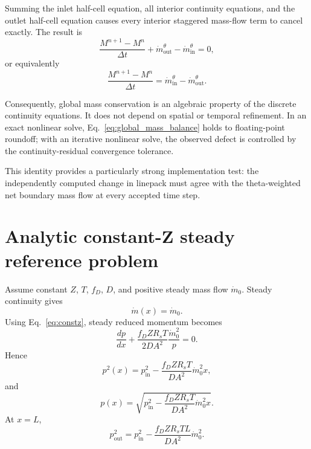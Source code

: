 \documentclass[11pt]{article}
\newcommand{\mdot}{\dot m}
\begin{document}
Summing the inlet half-cell equation,
all interior continuity equations, and the outlet half-cell equation
causes every interior staggered mass-flow term to cancel exactly.
The result is
\begin{equation}
\frac{M^{n+1}-M^n}{\Delta t}
+
\mdot_{\mathrm{out}}^\theta
-
\mdot_{\mathrm{in}}^\theta
=0,
\end{equation}
or equivalently
\begin{equation}
\boxed{
\frac{M^{n+1}-M^n}{\Delta t}
=
\mdot_{\mathrm{in}}^\theta
-
\mdot_{\mathrm{out}}^\theta.}
\label{eq:global_mass_balance}
\end{equation}

Consequently, global mass conservation is an algebraic property of the
discrete continuity equations.  It does not depend on spatial or
temporal refinement.  In an exact nonlinear solve,
Eq.~\eqref{eq:global_mass_balance} holds to floating-point roundoff;
with an iterative nonlinear solve, the observed defect is controlled
by the continuity-residual convergence tolerance.

This identity provides a particularly strong implementation test:
the independently computed change in linepack must agree with the
theta-weighted net boundary mass flow at every accepted time step.

\section{Analytic constant-Z steady reference problem}
Assume constant $Z$, $T$, $f_D$, $D$, and positive steady mass flow $\mdot_0$. Steady continuity gives
\begin{equation}
\mdot(x)=\mdot_0.
\end{equation}
Using Eq.~\eqref{eq:constz}, steady reduced momentum becomes
\begin{equation}
\frac{dp}{dx}+\frac{f_DZR_sT}{2DA^2}\frac{\mdot_0^2}{p}=0.
\end{equation}
Hence
\begin{equation}
\boxed{
p^2(x)=p_{\mathrm{in}}^2-
\frac{f_DZR_sT}{DA^2}\mdot_0^2 x,}
\label{eq:p2}
\end{equation}
and
\begin{equation}
p(x)=\sqrt{p_{\mathrm{in}}^2-
\frac{f_DZR_sT}{DA^2}\mdot_0^2x}.
\end{equation}
At $x=L$,
\begin{equation}
p_{\mathrm{out}}^2=p_{\mathrm{in}}^2-
\frac{f_DZR_sTL}{DA^2}\mdot_0^2.
\end{equation}
\end{document}

